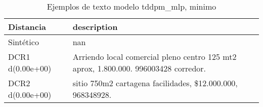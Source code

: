 \begin{table}[H]
\centering
\fontsize{10}{14}\selectfont
\caption{Ejemplos de texto modelo tddpm\_mlp, minimo}
\label{table-example-economicos-b-3-tddpm_mlp-min-text}
\begin{tabular}{|l|m{35em}|}
\hline
\rowcolor[gray]{0.8}
Distancia & description \\
\hline Sintético & nan \\
\hline DCR1 d(0.00e+00) & Arriendo local comercial pleno centro 125 mt2 aprox, 1.800.000. 996003428 corredor. \\
\hline DCR2 d(0.00e+00) & sitio 750m2 cartagena facilidades, \$12.000.000, 968348928. \\
\hline
\end{tabular}
\end{table}
